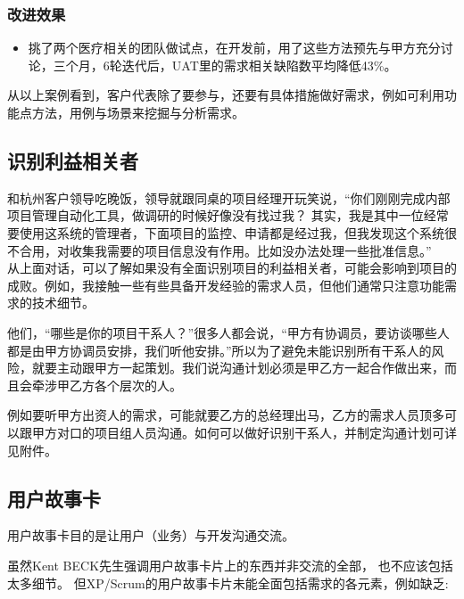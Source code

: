 \hypertarget{ux6539ux8fdbux6548ux679c}{%
\subsubsection{改进效果}\label{ux6539ux8fdbux6548ux679c}}

\begin{itemize}
\tightlist
\item
  挑了两个医疗相关的团队做试点，在开发前，用了这些方法预先与甲方充分讨论，三个月，6轮迭代后，UAT里的需求相关缺陷数平均降低43\%。
\end{itemize}

从以上案例看到，客户代表除了要参与，还要有具体措施做好需求，例如可利用功能点方法，用例与场景来挖掘与分析需求。

\hypertarget{ux8bc6ux522bux5229ux76caux76f8ux5173ux8005}{%
\subsection{识别利益相关者}\label{ux8bc6ux522bux5229ux76caux76f8ux5173ux8005}}

和杭州客户领导吃晚饭，领导就跟同桌的项目经理开玩笑说，``你们刚刚完成内部项目管理自动化工具，做调研的时候好像没有找过我？
其实，我是其中一位经常要使用这系统的管理者，下面项目的监控、申请都是经过我，但我发现这个系统很不合用，对收集我需要的项目信息没有作用。比如没办法处理一些批准信息。''\\
从上面对话，可以了解如果没有全面识别项目的利益相关者，可能会影响到项目的成败。例如，我接触一些有些具备开发经验的需求人员，但他们通常只注意功能需求的技术细节。

他们，“哪些是你的项目干系人？”很多人都会说，“甲方有协调员，要访谈哪些人都是由甲方协调员安排，我们听他安排。”所以为了避免未能识别所有干系人的风险，就要主动跟甲方一起策划。我们说沟通计划必须是甲乙方一起合作做出来，而且会牵涉甲乙方各个层次的人。

例如要听甲方出资人的需求，可能就要乙方的总经理出马，乙方的需求人员顶多可以跟甲方对口的项目组人员沟通。如何可以做好识别干系人，并制定沟通计划可详见附件。

\hypertarget{ux7528ux6237ux6545ux4e8bux5361}{%
\subsection{用户故事卡}\label{ux7528ux6237ux6545ux4e8bux5361}}

用户故事卡目的是让用户（业务）与开发沟通交流。

虽然Kent BECK先生强调用户故事卡片上的东西并非交流的全部，
也不应该包括太多细节。
但XP/Scrum的用户故事卡片未能全面包括需求的各元素，例如缺乏:

